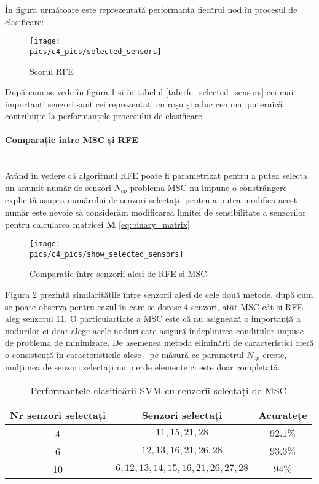 În figura următoare este reprezentată performanța fiecărui nod în procesul de clasificare:

\begin{figure}[H]
\centering
\texttt{[image: \\pics/c4\_pics/selected\_sensors]}
\caption{Scorul RFE}
\label{fig:rfe_score}
\end{figure}

După cum se vede în figura \ref{fig:rfe_score} și în tabelul \ref{tab:rfe_selected_sensors} cei mai importanți senzori sunt cei reprezentați cu roșu și aduc cea mai puternică contribuție la performanțele procesului de clasificare.

\paragraph{Comparație între MSC și RFE} \mbox{} \\ 
Având în vedere că algoritmul RFE poate fi parametrizat pentru a putea selecta un anumit număr de senzori $N_{cp}$ problema MSC nu impune o constrângere explicită asupra numărului de senzori selectați, pentru a putea modifica acest număr este nevoie să considerăm modificarea limitei de sensibilitate a senzorilor pentru calcularea matricei $\mathbf{M}$ \eqref{eq:binary_matrix}

\begin{figure}[H]
\centering
\texttt{[image: \\pics/c4\_pics/show\_selected\_sensors]}
\caption{Comparație între senzorii aleși de  RFE și MSC}
\label{fig:rfe_vs_msc}
\end{figure}

Figura \ref{fig:rfe_vs_msc} prezintă similaritățile între senzorii aleși de cele două metode, după cum se poate observa pentru cazul în care se doresc 4 senzori, atât MSC cât și RFE aleg senzorul 11. O particulartiate a MSC este că nu asignează o importanță a nodurilor ci doar alege acele noduri care asigură îndeplinirea condițiilor impuse de problema de minimizare. De asemenea metoda eliminării de caracteristici oferă o consistență în caracteristicile alese - pe măsură ce parametrul $N_{cp}$ crește, mulțimea de senzori selectați nu pierde elemente ci este doar completată.

\begin{table}[H]
    \centering
    \begin{tabular}{|c|c|c|}
    \hline
        Nr senzori selectați & Senzori selectați & Acuratețe \\
        \hline
        4 & $11, 15, 21, 28 $& $92.1\%$ \\
        \hline
        6 & $12, 13, 16,21, 26,28 $ & $93.3\%$\\
        \hline
        10 & $6,12,13,14,15,16,21,26,27,28$ & $94\%$\\
        \hline
    \end{tabular}
    \caption{Performanțele clasificării SVM cu senzorii selectați de MSC}
    \label{tab:msc_selected_sensors}
\end{table}